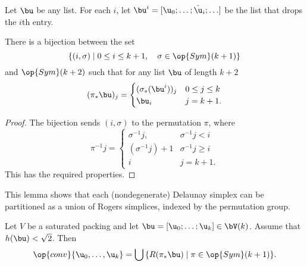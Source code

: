 \begin{definition}
Let $\bu$ be any list.
For each $i$,  let
$\bu^i = [\u_0;\ldots;\hat\u_i;\ldots]$ be the list that drops the $i$th entry.
\end{definition}

\begin{lemma}\label{lemma:coset-bijection} 
There is a bijection between the set 
\[  
\{(i,\sigma)\mid 0\le i\le k+1,\quad \sigma\in \op{Sym}(k+1)\}
\] 
and $\op{Sym}(k+2)$ such that for any list $\bu$ of length $k+2$
\[
(\pi_*\bu)_j = \begin{cases} (\sigma_*(\bu^i))_j&0\le j \le k\\
  \bu_i & j=k+1.
\end{cases}
\]
\end{lemma}

\begin{proof} 
The bijection sends $(i,\sigma)$ to the permutation $\pi$, where
\[  
\pi^{-1} j = \begin{cases} 
\sigma^{-1} j, & \sigma^{-1} j<i\\
(\sigma^{-1}j)+1 & \sigma^{-1} j \ge i\\
i& j=k+1.
\end{cases}
\] 
This has the required properties.
\end{proof}

This lemma shows that each (nondegenerate) Delaunay simplex can be
partitioned as a union of Rogers simplices, indexed by the permutation
group.

\begin{lemma}\label{lemma:Rconv}  
  Let $V$ be a saturated packing and let $\bu = [\u_0;\ldots;\u_k]\in
  \bV(k)$.  Assume that $h(\bu)<\sqrt2$.  
  Then
\[  
\op{conv}\{ \u_0,\ldots, \u_k\} = \bigcup \,\{ R(\pi_*\bu) \mid \pi\in \op{Sym}(k+1)\}.
\] 
\end{lemma}
%

